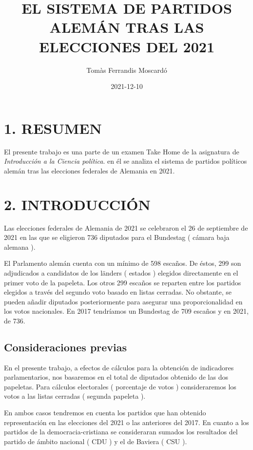 \documentclass[
]{article}
\title{EL SISTEMA DE PARTIDOS ALEMÁN TRAS LAS ELECCIONES DEL 2021}
\author{Tomàs Ferrandis Moscardó}
\date{2021-12-10}
\begin{document}
\maketitle

{
\setcounter{tocdepth}{2}
\tableofcontents
}
\hypertarget{resumen}{%
\section{1. RESUMEN}\label{resumen}}

El presente trabajo es una parte de un examen Take Home de la asignatura
de \emph{Introducción a la Ciencia política}. en él se analiza el
sistema de partidos políticos alemán tras las elecciones federales de
Alemania en 2021.

\hypertarget{introducciuxf3n}{%
\section{2. INTRODUCCIÓN}\label{introducciuxf3n}}

Las elecciones federales de Alemania de 2021 se celebraron el 26 de
septiembre de 2021 en las que se eligieron 736 diputados para el
Bundestag ( cámara baja alemana ).

El Parlamento alemán cuenta con un mínimo de 598 escaños. De éstos, 299
son adjudicados a candidatos de los länders ( estados ) elegidos
directamente en el primer voto de la papeleta. Los otros 299 escaños se
reparten entre los partidos elegidos a través del segundo voto basado en
listas cerradas. No obstante, se pueden añadir diputados posteriormente
para asegurar una proporcionalidad en los votos nacionales. En 2017
tendríamos un Bundestag de 709 escaños y en 2021, de 736.

\hypertarget{consideraciones-previas}{%
\subsection{Consideraciones previas}\label{consideraciones-previas}}

En el presente trabajo, a efectos de cálculos para la obtención de
indicadores parlamentarios, nos basaremos en el total de diputados
obtenido de las dos papeletas. Para cálculos electorales ( porcentaje de
votos ) consideraremos los votos a las listas cerradas ( segunda
papeleta ).

En ambos casos tendremos en cuenta los partidos que han obtenido
representación en las elecciones del 2021 o las anteriores del 2017. En
cuanto a los partidos de la democracia-cristiana se consideraran sumados
los resultados del partido de ámbito nacional ( CDU ) y el de Baviera (
CSU ).
\end{document}
